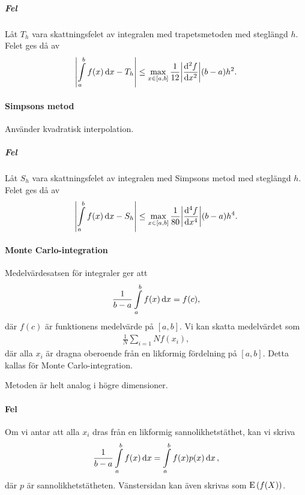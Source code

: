 \subparagraph{Fel}
Låt $T_{h}$ vara skattningsfelet av integralen med trapetsmetoden med steglängd $h$. Felet ges då av
\begin{align*}
	\abs{\int\limits_{a}^{b}f(x)\dd{x} - T_{h}} \leq \max\limits_{x\in [a, b]}\frac{1}{12}\abs{\dv[2]{f}{x} (x)}(b - a)h^{2}.
\end{align*}

\paragraph{Simpsons metod}
Använder kvadratisk interpolation.

\subparagraph{Fel}
Låt $S_{h}$ vara skattningsfelet av integralen med Simpsons metod med steglängd $h$. Felet ges då av
\begin{align*}
	\abs{\int\limits_{a}^{b}f(x)\dd{x} - S_{h}} \leq \max\limits_{x\in [a, b]}\frac{1}{80}\abs{\dv[4]{f}{x} (x)}(b - a)h^{4}.
\end{align*}

\paragraph{Monte Carlo-integration}
Medelvärdesatsen för integraler ger att
\begin{align*}
	\frac{1}{b - a}\int\limits_{a}^{b}f(x)\dd{x} = f(c),
\end{align*}
där $f(c)$ är funktionens medelvärde på $[a, b]$. Vi kan skatta medelvärdet som
\begin{align*}
	\frac{1}{N}\sum\limits_{i = 1}{N}f(x_{i}),
\end{align*}
där alla $x_{i}$ är dragna oberoende från en likformig fördelning på $[a, b]$. Detta kallas för Monte Carlo-integration.

Metoden är helt analog i högre dimensioner.

\paragraph{Fel}
Om vi antar att alla $x_{i}$ dras från en likformig sannolikhetstäthet, kan vi skriva
\begin{align*}
	\frac{1}{b - a}\int\limits_{a}^{b}f(x)\dd{x} = \int\limits_{a}^{b}f(x)p(x)\dd{x},
\end{align*}
där $p$ är sannolikhetstätheten. Vänstersidan kan även skrivas som $\text{E}\left(f(X)\right)$.

